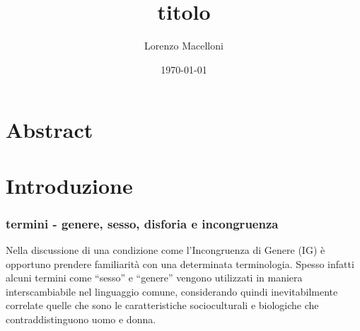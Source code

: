 \documentclass[11pt]{article}
\author{Lorenzo Macelloni}
\date{\today}
\title{titolo}
\begin{document}
\maketitle
\tableofcontents

\section{Abstract}
\label{sec:org7d0541f}

\section{Introduzione}
\label{sec:orgb103e92}
\subsubsection{termini - genere, sesso, disforia e incongruenza}
\label{sec:orgd200e60}
Nella discussione di una condizione come l'Incongruenza di Genere (IG) è
opportuno prendere familiarità con una determinata terminologia. Spesso infatti
alcuni termini come ``sesso'' e ``genere'' vengono utilizzati in maniera
interscambiabile nel linguaggio comune, considerando quindi inevitabilmente
correlate quelle che sono le caratteristiche socioculturali e biologiche che
contraddistinguono uomo e donna.
\end{document}

